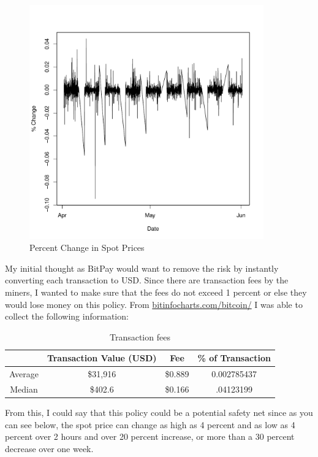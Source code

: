 \documentclass{paper}
\begin{document}
\begin{doublespacing}
\begin{figure}[H]
\begin{minipage}{0.5\textwidth}
    \end{minipage}\hfill
    \begin{minipage}{0.5\textwidth}
        \centering
        \includegraphics[width=0.9\textwidth]{PercentChange.pdf} %
        \caption{Percent Change in Spot Prices}\label{perchan}
    \end{minipage}
\end{figure}
My initial thought as BitPay would want to remove the risk by instantly converting each transaction to USD. Since there are transaction fees by the miners, I wanted to make sure that the fees do not exceed 1 percent or else they would lose money on this policy. From \url{bitinfocharts.com/bitcoin/} I was able to collect the following information:
\begin{table}[H]
\centering
\begin{tabular}{| c | c  c | c |}\hline
 & Transaction Value (USD) & Fee & \% of Transaction\\\hline
Average & \$31,916 & \$0.889 & 0.002785437\\
Median & \$402.6 & \$0.166 & .04123199\\\hline
\end{tabular}
\caption{Transaction fees}\label{trans}
\end{table}
From this, I could say that this policy could be a potential safety net since as you can see below, the spot price can change as high as 4 percent and as low as 4 percent over 2 hours and over 20 percent increase, or more than a 30 percent decrease over one week. 

\end{doublespacing}
\end{document}
